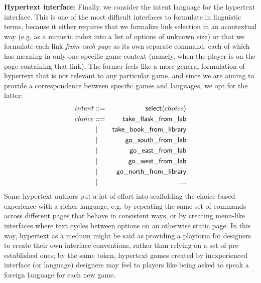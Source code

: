 


  \textbf{Hypertext interface}:
  Finally, we consider the intent language for the hypertext interface.
  This is one of the most difficult interfaces to formulate in linguistic
  terms, because it either requires that we formalize link selection in an
  acontextual way (e.g. as a numeric index into a list of options of
  unknown size) or that we formulate each link {\em from each page} as its
  own separate command, each of which has meaning in only one specific game
  context (namely, when the player is on the page containing that link).
  The former feels like a more general formulation of hypertext that is not
  relevant to any particular game, and since we are aiming to provide a
  correspondence between specific games and languages, we opt for the
  latter:
  \begin{eqnarray*}
    intent &::=& \mathsf{select}\langle choice \rangle\\
    choice &::=& \mathsf{take\_flask\_from\_lab}\\
           &\mid& \mathsf{take\_book\_from\_library}\\
           &\mid& \mathsf{go\_south\_from\_lab} \\
           &\mid& \mathsf{go\_east\_from\_lab} \\
           &\mid& \mathsf{go\_west\_from\_lab} \\
           &\mid& \mathsf{go\_north\_from\_library} \\
           &\mid& \hdots
  \end{eqnarray*}
  Some hypertext authors put a lot of effort into scaffolding the
  choice-based experience with a richer language, e.g. by repeating the
  same set of commands across different pages that behave in consistent
  ways, or by creating menu-like interfaces where text cycles between
  options on an otherwise static page. In this way, hypertext as a medium
  might be said as providing a playform for designers to create their own
  interface conventions, rather than relying on a set of pre-established
  ones; by the same token, hypertext games created by inexperienced
  interface (or language) designers may feel to players like being asked to
  speak a foreign language for each new game.

